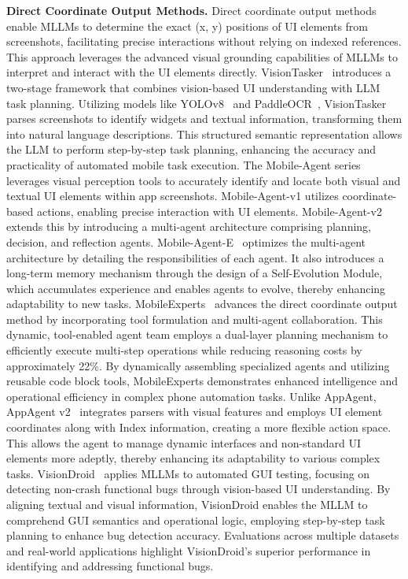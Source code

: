 \noindent\textbf{Direct Coordinate Output Methods.}
Direct coordinate output methods enable MLLMs to determine the exact (x, y) positions of UI elements from screenshots, facilitating precise interactions without relying on indexed references. This approach leverages the advanced visual grounding capabilities of MLLMs to interpret and interact with the UI elements directly.
VisionTasker~\cite{song2024visiontasker} introduces a two-stage framework that combines vision-based UI understanding with LLM task planning. Utilizing models like YOLOv8~\cite{varghese2024yolov8} and PaddleOCR~\cite{du2020pp}, VisionTasker parses screenshots to identify widgets and textual information, transforming them into natural language descriptions. This structured semantic representation allows the LLM to perform step-by-step task planning, enhancing the accuracy and practicality of automated mobile task execution.
The Mobile-Agent series~\cite{wang2024mobileagentv1, wang2024mobileagentv2} leverages visual perception tools to accurately identify and locate both visual and textual UI elements within app screenshots. Mobile-Agent-v1 utilizes coordinate-based actions, enabling precise interaction with UI elements. Mobile-Agent-v2 extends this by introducing a multi-agent architecture comprising planning, decision, and reflection agents.
Mobile-Agent-E~\cite{wang2025mobile} optimizes the multi-agent architecture by detailing the responsibilities of each agent. It also introduces a long-term memory mechanism through the design of a Self-Evolution Module, which accumulates experience and enables agents to evolve, thereby enhancing adaptability to new tasks.
MobileExperts~\cite{zhang2024mobileexperts} advances the direct coordinate output method by incorporating tool formulation and multi-agent collaboration. This dynamic, tool-enabled agent team employs a dual-layer planning mechanism to efficiently execute multi-step operations while reducing reasoning costs by approximately 22\%. By dynamically assembling specialized agents and utilizing reusable code block tools, MobileExperts demonstrates enhanced intelligence and operational efficiency in complex phone automation tasks.
Unlike AppAgent, AppAgent v2~\cite{li2024appagentv2} integrates parsers with visual features and employs UI element coordinates along with Index information, creating a more flexible action space. This allows the agent to manage dynamic interfaces and non-standard UI elements more adeptly, thereby enhancing its adaptability to various complex tasks.
VisionDroid~\cite{liu2024vision} applies MLLMs to automated GUI testing, focusing on detecting non-crash functional bugs through vision-based UI understanding. By aligning textual and visual information, VisionDroid enables the MLLM to comprehend GUI semantics and operational logic, employing step-by-step task planning to enhance bug detection accuracy. Evaluations across multiple datasets and real-world applications highlight VisionDroid's superior performance in identifying and addressing functional bugs.


